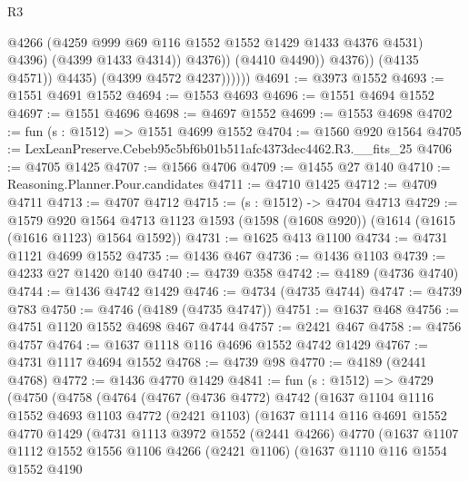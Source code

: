\begin{lexlean}{R3}
\begin{coremodule}
                                @4266
                                (@4259 @999 @69 @116 @1552 @1552 @1429 @1433 @4376 @4531)
                                @4396)
                              (@4399 @1433 @4314))
                            @4376))
                        (@4410 @4490))
                      @4376))
                  (@4135 @4571))
                @4435)
              (@4399 @4572 @4237))))))
@4691 := @3973 @1552
@4693 := @1551 @4691 @1552
@4694 := @1553 @4693
@4696 := @1551 @4694 @1552
@4697 := @1551 @4696
@4698 := @4697 @1552
@4699 := @1553 @4698
@4702 := fun (s : @1512) => @1551 @4699 @1552
@4704 := @1560 @920 @1564
@4705 := LexLeanPreserve.Cebeb95c5bf6b01b511afc4373dec4462.R3.__fits_25
@4706 := @4705 @1425
@4707 := @1566 @4706
@4709 := @1455 @27 @140
@4710 := Reasoning.Planner.Pour.candidates
@4711 := @4710 @1425
@4712 := @4709 @4711
@4713 := @4707 @4712
@4715 := (s : @1512) -> @4704 @4713
@4729 := @1579
    @920
    @1564
    @4713
    @1123
    @1593
    (@1598 (@1608 @920))
    (@1614 (@1615 (@1616 @1123) @1564 @1592))
@4731 := @1625 @413 @1100
@4734 := @4731 @1121 @4699 @1552
@4735 := @1436 @467
@4736 := @1436 @1103
@4739 := @4233 @27 @1420 @140
@4740 := @4739 @358
@4742 := @4189 (@4736 @4740)
@4744 := @1436 @4742 @1429
@4746 := @4734 (@4735 @4744)
@4747 := @4739 @783
@4750 := @4746 (@4189 (@4735 @4747))
@4751 := @1637 @468
@4756 := @4751 @1120 @1552 @4698 @467 @4744
@4757 := @2421 @467
@4758 := @4756 @4757
@4764 := @1637 @1118 @116 @4696 @1552 @4742 @1429
@4767 := @4731 @1117 @4694 @1552
@4768 := @4739 @98
@4770 := @4189 (@2441 @4768)
@4772 := @1436 @4770 @1429
@4841 := fun (s : @1512) =>
  @4729
    (@4750
      (@4758
        (@4764
          (@4767
            (@4736 @4772)
            @4742
            (@1637
              @1104
              @1116
              @1552
              @4693
              @1103
              @4772
              (@2421 @1103)
              (@1637
                @1114
                @116
                @4691
                @1552
                @4770
                @1429
                (@4731
                  @1113
                  @3972
                  @1552
                  (@2441 @4266)
                  @4770
                  (@1637
                    @1107
                    @1112
                    @1552
                    @1556
                    @1106
                    @4266
                    (@2421 @1106)
                    (@1637
                      @1110
                      @116
                      @1554
                      @1552
                      @4190

\end{coremodule}
\end{lexlean}
